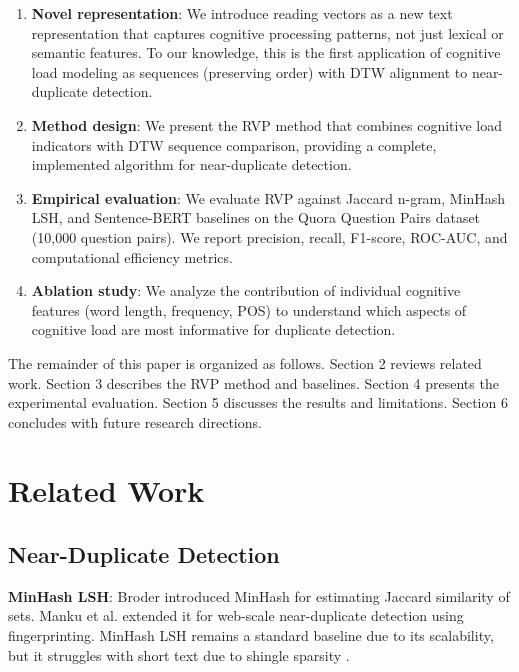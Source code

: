 \documentclass[11pt,letterpaper]{article}
\begin{document}
\begin{enumerate}
\item \textbf{Novel representation}: We introduce reading vectors as a new text representation that captures cognitive processing patterns, not just lexical or semantic features. To our knowledge, this is the first application of cognitive load modeling as sequences (preserving order) with DTW alignment to near-duplicate detection.

\item \textbf{Method design}: We present the RVP method that combines cognitive load indicators with DTW sequence comparison, providing a complete, implemented algorithm for near-duplicate detection.

\item \textbf{Empirical evaluation}: We evaluate RVP against Jaccard n-gram, MinHash LSH, and Sentence-BERT baselines on the Quora Question Pairs dataset (10,000 question pairs). We report precision, recall, F1-score, ROC-AUC, and computational efficiency metrics.

\item \textbf{Ablation study}: We analyze the contribution of individual cognitive features (word length, frequency, POS) to understand which aspects of cognitive load are most informative for duplicate detection.
\end{enumerate}

The remainder of this paper is organized as follows. Section 2 reviews related work. Section 3 describes the RVP method and baselines. Section 4 presents the experimental evaluation. Section 5 discusses the results and limitations. Section 6 concludes with future research directions.

\section{Related Work}

\subsection{Near-Duplicate Detection}

\textbf{MinHash LSH}: Broder \cite{Broder1997} introduced MinHash for estimating Jaccard similarity of sets. Manku et al. \cite{Manku2007} extended it for web-scale near-duplicate detection using fingerprinting. MinHash LSH remains a standard baseline due to its scalability, but it struggles with short text due to shingle sparsity \cite{Theobald2008}.
\end{document}
